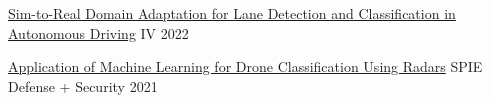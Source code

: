     
\headedsubsection %
{\href{https://arxiv.org/abs/2202.07133}{Sim-to-Real Domain Adaptation for Lane Detection and Classification in Autonomous Driving}}
{IV 2022}
{
}

\headedsubsection
{\href{https://www.spiedigitallibrary.org/conference-proceedings-of-spie/11756/117560C/Application-of-machine-learning-for-drone-classification-using-radars/10.1117/12.2588694.short?SSO=1}
{Application of Machine Learning for Drone Classification Using Radars}}
{SPIE Defense + Security 2021}
{
}
